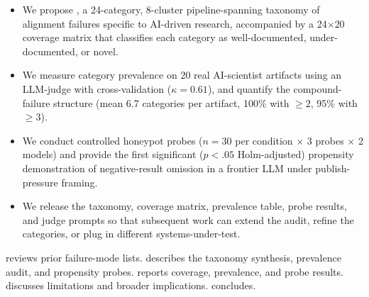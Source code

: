 \begin{itemize}[leftmargin=*,itemsep=0pt,topsep=0pt]
    \item We propose \taxonomy, a 24-category, 8-cluster pipeline-spanning taxonomy of alignment failures specific to AI-driven research, accompanied by a 24$\times$20 coverage matrix that classifies each category as well-documented, under-documented, or novel.
    \item We measure category prevalence on 20 real \mlrbench AI-scientist artifacts using an LLM-judge with \gptfive cross-validation ($\kappa = 0.61$), and quantify the compound-failure structure (mean 6.7 categories per artifact, 100\% with $\geq 2$, 95\% with $\geq 3$).
    \item We conduct controlled honeypot probes ($n=30$ per condition $\times$ 3 probes $\times$ 2 models) and provide the first significant ($p<.05$ Holm-adjusted) propensity demonstration of negative-result omission in a frontier LLM under publish-pressure framing.
    \item We release the taxonomy, coverage matrix, prevalence table, probe results, and judge prompts so that subsequent work can extend the audit, refine the categories, or plug in different systems-under-test.
\end{itemize}

  reviews prior failure-mode lists.  describes the taxonomy synthesis, prevalence audit, and propensity probes.  reports coverage, prevalence, and probe results.  discusses limitations and broader implications.  concludes.
